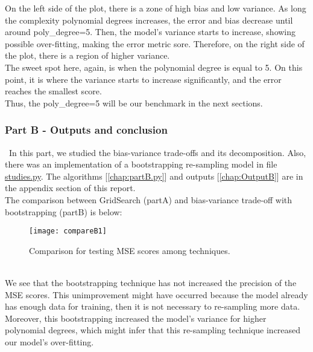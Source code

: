 On the left side of the plot, there is a zone of high bias and low variance. As long the complexity polynomial degrees increases, the error and bias decrease until around poly\_degree=5. Then, the model's variance starts to increase, showing possible over-fitting, making the error metric sore. Therefore, on the right side of the plot, there is a region of higher variance. \\

The sweet spot here, again, is when the polynomial degree is equal to 5. On this point, it is where the variance starts to increase significantly, and the error reaches the smallest score. \\

Thus, the poly\_degree=5 will be our benchmark in the next sections. \\

\subsubsection{Part B - Outputs and conclusion}
\label{chap:Part B - Outputs and conclusion}

\quad \, In this part, we studied the bias-variance trade-offs and its decomposition. Also, there was an implementation of a bootstrapping re-sampling model in file \href{https://github.com/fabiorodp/UiO-FYS-STK4155/blob/master/Project1/package/studies.py}{studies.py}. The algorithms [\autoref{chap:partB.py}] and outputs [\autoref{chap:OutputB}] are in the appendix section of this report. \\

The  comparison  between  GridSearch  (partA)  and  bias-variance  trade-off with bootstrapping (partB) is below: \\

\begin{figure}[h]
\label{fig:compareB1}
\texttt{[image: compareB1]}
\caption{Comparison for testing MSE scores among techniques.}
\centering
\end{figure}\\

We see that the bootstrapping technique has not increased the precision of the MSE scores. This unimprovement might have occurred because the model already has enough data for training, then it is not necessary to re-sampling more data. Moreover, this bootstrapping increased the model's variance for higher polynomial degrees, which might infer that this re-sampling technique increased our model's over-fitting. \\


